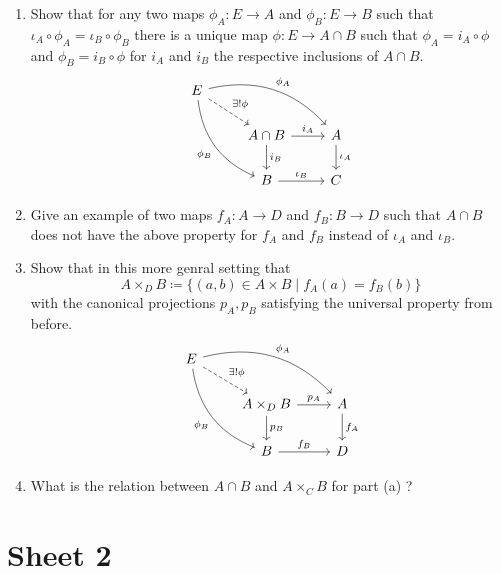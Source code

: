 \begin{enumerate}[label=(\alph*)]
    \item 
    Show that for any two maps $ \phi_A \colon E \to A $ and $ \phi_B \colon E  \to B $ such that $ \iota_A \circ \phi_A = \iota_B \circ \phi_B $ there is a unique map $ \phi \colon E \to A \cap B $ such that $ \phi_A = i_A \circ \phi $ and $ \phi_B = i_B \circ \phi $ for $ i_A $ and $ i_B $ the respective inclusions of $ A \cap B $. 
    \[
    \begin{tikzcd}
        E 
        \ar[rd, dashed, " \exists ! \phi" ]
        \ar[rrd, bend left, " \phi_A" ]
        \ar[rdd, bend right, " \phi_B" ']
        \\
        &
        A \cap B
        \ar[r , " i_A " ]
        \ar[d , " i_B " ]
        &
        A
        \ar[ d , " \iota_A" ]
        \\
        &
        B
        \ar[r, " \iota_B " ]
        &
        C
    \end{tikzcd}
    \]

    \item 
    Give an example of two maps $ f_A \colon A \to D $ and $ f_B \colon B \to D $ such that $ A \cap B $ does not have the above property for $ f_A $ and $ f_B $ instead of $ \iota_A $ and $ \iota_B $.

    \item 
    Show that in this more genral setting that
    \[
        A \times_D B \coloneqq \{ ( a, b ) \in A \times B \mid f_A ( a ) = f_B ( b ) \}
    \]
    with the canonical projections $ p_A, p_B$ satisfying the universal property from before.
    \[
    \begin{tikzcd}
        E 
        \ar[rd, dashed, " \exists ! \phi" ]
        \ar[rrd, bend left, " \phi_A" ]
        \ar[rdd, bend right, " \phi_B" ']
        \\
        &
        A \times_D B
        \ar[r , " p_A " ]
        \ar[d , " p_B " ]
        &
        A
        \ar[ d , " f_A" ]
        \\
        &
        B
        \ar[r, " f_B " ]
        &
        D
    \end{tikzcd}
    \]

    \item 
    What is the relation between $ A \cap B $ and $ A \times_C B$ for part (a) ?
\end{enumerate}


\section{Sheet 2}

